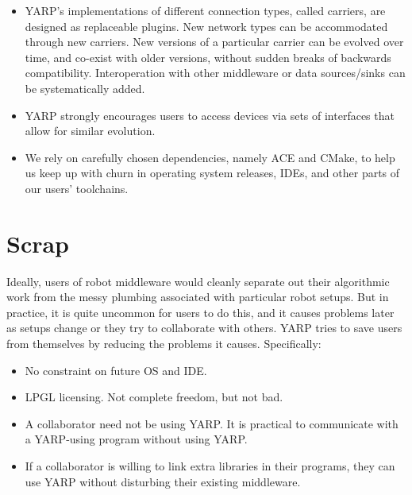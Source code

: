 \begin{itemize}

\item YARP's implementations of different connection types, called
carriers, are designed as replaceable plugins.  New network types can
be accommodated through new carriers.  New versions of a particular
carrier can be evolved over time, and co-exist with older versions,
without sudden breaks of backwards compatibility.  Interoperation
with other middleware or data sources/sinks can be systematically
added.

\item YARP strongly encourages users to access devices via sets of
interfaces that allow for similar evolution.

\item We rely on carefully chosen dependencies, namely ACE and CMake,
to help us keep up with churn in operating system releases, IDEs, and
other parts of our users' toolchains.

\end{itemize}

\section{Scrap}


Ideally, users of robot middleware would cleanly separate out their
algorithmic work from the messy plumbing associated with particular
robot setups.  But in practice, it is quite uncommon for users to do
this, and it causes problems later as setups change or they try to
collaborate with others.  YARP tries to save users from themselves
by reducing the problems it causes.  Specifically:

\begin{itemize}

\item No constraint on future OS and IDE.

\item LPGL licensing.  Not complete freedom, but not bad.

\item A collaborator need not be using YARP.  It is practical to
communicate with a YARP-using program without using YARP.

\item If a collaborator is willing to link extra libraries in their
programs, they can use YARP without disturbing their existing
middleware.

\end{itemize}

